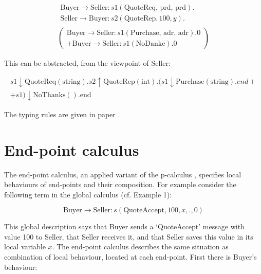 \begin{equation*}
\begin{array}{c}
\begin{array}{c}
\text{Buyer} \rightarrow \text{Seller}:s1(\text{QuoteReq, prd, prd}). \\
\text{Seller} \rightarrow \text{Buyer}:s2(\text{QuoteRep}, 100, y).
\end{array}\\
\left(\begin{array}{c} \text{Buyer} \rightarrow \text{Seller}:s1(\text{Purchase, adr, adr}).0 \\ 
+ \text{Buyer} \rightarrow \text{Seller}:s1(\text{NoDanke}).0
\end{array}\right)
\end{array}
\end{equation*}

This can be abstracted, from the viewpoint of Seller:

\begin{equation*}
\begin{array}{c}
s1 \downarrow \text{QuoteReq}(\text{string}).s2 \uparrow \text{QuoteRep}(\text{int}).(s1 \downarrow \text{Purchase}(\text{string}).end + \\ + s1) \downarrow \text{NoThanks}().\text{end}
\end{array}
\end{equation*}

The typing rules are given in paper \cite{com-centered-basis}.

\section{End-point calculus}
\label{sec:end-point-calc}

The end-point calculus, an applied variant of the p-calculus \cite{poly-p-calc}, specifies local behaviours of end-points and their composition. For example consider the following term in the global calculus (cf. Example 1):

\begin{equation*}
\text{Buyer} \rightarrow \text{Seller} : s(\text{QuoteAccept}, 100, x, ., 0)
\end{equation*}

This global description says that Buyer sends a `QuoteAccept' message with value 100 to Seller, that Seller receives it, and that Seller saves this value in its local variable $x$. The end-point calculus describes the same situation as combination of local behaviour, located at each end-point. First there is Buyer's behaviour:

